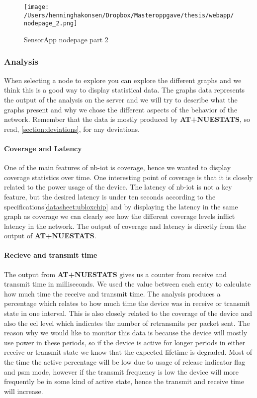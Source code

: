 \documentclass[USenglish]{ifimaster}  %
\begin{document}
\begin{figure}[H]
  \centering
  \texttt{[image: /Users/henninghakonsen/Dropbox/Masteroppgave/thesis/webapp/nodepage\_2.png]}
  \caption{SensorApp nodepage part 2}
  \label{pic:nodepage2}
\end{figure}

\subsubsection{Analysis} \label{ssection:analysis}
When selecting a node to explore you can explore the different graphs and we think this is a good way to display statistical data. The graphs data represents the output of the analysis on the server and we will try to describe what the graphs present and why we chose the different aspects of the behavior of the network. Remember that the data is mostly produced by \textbf{AT+NUESTATS}, so read, \vref{section:deviations}, for any deviations.

\paragraph{Coverage and Latency}
One of the main features of \acrshort{nb-iot} is coverage, hence we wanted to display coverage statistics over time. One interesting point of coverage is that it is closely related to the power usage of the device. The latency of \acrshort{nb-iot} is not a key feature, but the desired latency is under ten seconds according to the specifications\vref{datasheet:ubloxchip} and by displaying the latency in the same graph as coverage we can clearly see how the different coverage levels inflict latency in the network. The output of coverage and latency is directly from the output of \textbf{AT+NUESTATS}.

\paragraph{Recieve and transmit time}
The output from \textbf{AT+NUESTATS} gives us a counter from receive and transmit time in milliseconds. We used the value between each entry to calculate how much time the receive and transmit time. The analysis produces a percentage which relates to how much time the device was in receive or transmit state in one interval. This is also closely related to the coverage of the device and also the \acrshort{ecl} level which indicates the number of retransmits per packet sent. The reason why we would like to monitor this data is because the device will mostly use power in these periods, so if the device is active for longer periods in either receive or transmit state we know that the expected lifetime is degraded. Most of the time the active percentage will be low due to usage of release indicator flag and \acrshort{psm} mode, however if the transmit frequency is low the device will more frequently be in some kind of active state, hence the transmit and receive time will increase.
\end{document}
